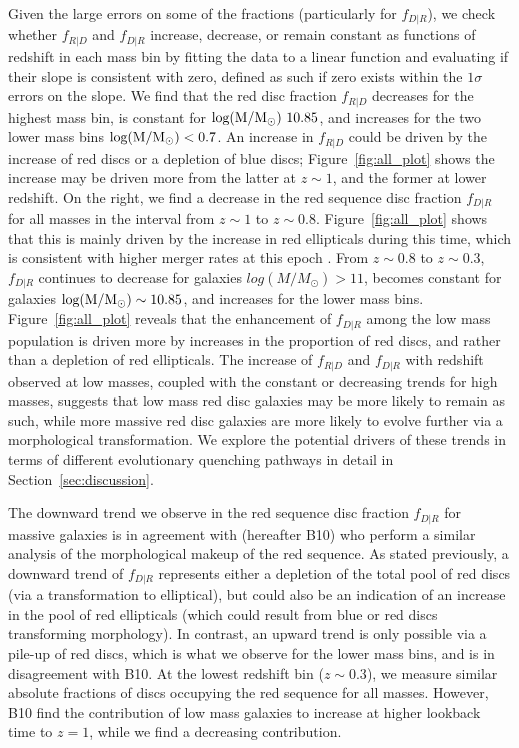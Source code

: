 \documentclass[useAMS,usenatbib]{mn2e}
\begin{document}
Given the large errors on some of the fractions (particularly for $f_{D|R}$), we check whether $f_{R|D}$ and $f_{D|R}$ increase, decrease, or remain constant as functions of redshift in each mass bin by fitting the data to a linear function and evaluating if their slope is consistent with zero, defined as such if zero exists within the $1 \sigma$ errors on the slope. We find that the red disc fraction $f_{R|D}$ decreases for the highest mass bin, is constant for $\rm log(M/M_{\odot})~10.85$, and increases for the two lower mass bins $\rm log(M/M_{\odot})<0.7$. An increase in $f_{R|D}$ could be driven by the increase of red discs or a depletion of blue discs; Figure~\ref{fig:all_plot} shows the increase may be driven more from the latter at $z\sim1$, and the former at lower redshift. On the right, we find a decrease in the red sequence disc fraction $f_{D|R}$ for all masses in the interval from $z\sim1$ to $z\sim0.8$. Figure~\ref{fig:all_plot} shows that this is mainly driven by the increase in red ellipticals during this time, which is consistent with higher merger rates at this epoch \citep{Molina2016}. From $z\sim0.8$ to $z\sim0.3$, $f_{D|R}$ continues to decrease for galaxies $log(M/M_{\odot})>11$, becomes constant for galaxies $\rm log(M/M_{\odot})\sim10.85$, and increases for the lower mass bins. Figure~\ref{fig:all_plot} reveals that the enhancement of $f_{D|R}$ among the low mass population is driven more by increases in the proportion of red discs, and rather than a depletion of red ellipticals. The increase of $f_{R|D}$ and $f_{D|R}$ with redshift observed at low masses, coupled with the constant or decreasing trends for high masses, suggests that low mass red disc galaxies may be more likely to remain as such, while more massive red disc galaxies are more likely to evolve further via a morphological transformation. We explore the potential drivers of these trends in terms of different evolutionary quenching pathways in detail in Section~\ref{sec:discussion}.

The downward trend we observe in the red sequence disc fraction $f_{D|R}$ for massive galaxies is in agreement with \citet{Bundy2010} (hereafter B10) who perform a similar analysis of the morphological makeup of the red sequence. As stated previously, a downward trend of $f_{D|R}$ represents either a depletion of the total pool of red discs (via a transformation to elliptical), but could also be an indication of an increase in the pool of red ellipticals (which could result from blue or red discs transforming morphology). In contrast, an upward trend is only possible via a pile-up of red discs, which is what we observe for the lower mass bins, and is in disagreement with B10. At the lowest redshift bin ($z\sim0.3$), we measure similar absolute fractions of discs occupying the red sequence for all masses. However, B10 find the contribution of low mass galaxies to increase at higher lookback time to $z=1$, while we find a decreasing contribution. 
\end{document}
